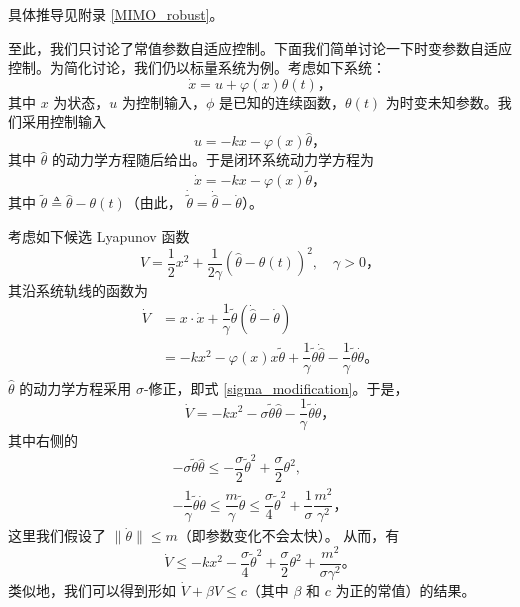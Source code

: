 具体推导见附录 \ref{MIMO_robust}。

至此，我们只讨论了常值参数自适应控制。下面我们简单讨论一下时变参数自适应控制。为简化讨论，我们仍以标量系统为例。考虑如下系统：
\begin{equation}
    \dot{x} = u + \varphi(x) \theta(t) \text{，}
\end{equation}
其中 $x$ 为状态，$u$ 为控制输入，$\phi$ 是已知的连续函数，$\theta(t)$ 为时变未知参数。我们采用控制输入
\[
    u = -k x - \varphi(x) \hat{\theta} \text{，}
\]
其中 $\hat{\theta}$ 的动力学方程随后给出。于是闭环系统动力学方程为
\[
    \dot{x} = -k x - \varphi(x) \tilde{\theta} \text{，}
\]
其中 $\tilde{\theta} \triangleq \hat{\theta} - \theta(t)$（由此， $\dot{\tilde{\theta}} = \dot{\hat{\theta}} - \dot{\theta}$）。

考虑如下候选 Lyapunov 函数
\[
    V = \dfrac{1}{2} x^2 + \dfrac{1}{2 \gamma} {\left( \hat{\theta} - \theta(t) \right)}^2, \quad \gamma > 0 \text{，}
\]
其沿系统轨线的函数为
\begin{align*}
    \dot{V} &= x \cdot \dot{x} + \dfrac{1}{\gamma} \tilde{\theta} \left( \dot{\hat{\theta}} - \dot{\theta} \right) \\
    &= -k x^2 - \varphi(x) x \tilde{\theta} + \dfrac{1}{\gamma} \tilde{\theta} \dot{\hat{\theta}} - \dfrac{1}{\gamma} \tilde{\theta} \dot{\theta} \text{。}
\end{align*}
$\hat{\theta}$ 的动力学方程采用 $\sigma$-修正，即式 \eqref{sigma_modification}。于是，
\[
    \dot{V} = -k x^2 - \sigma \tilde{\theta} \hat{\theta} - \dfrac{1}{\gamma} \tilde{\theta} \dot{\theta} \text{，}
\]
其中右侧的
\begin{gather*}
    -\sigma \tilde{\theta} \hat{\theta} \leq -\dfrac{\sigma}{2} {\tilde{\theta}}^2 + \dfrac{\sigma}{2} {\theta}^2, \\
    -\dfrac{1}{\gamma} \tilde{\theta} \dot{\theta} \leq \dfrac{m}{\gamma} \tilde{\theta} \leq \dfrac{\sigma}{4} \tilde{\theta}^2 + \dfrac{1}{\sigma} \dfrac{m^2}{\gamma^2} \text{，}
\end{gather*}
这里我们假设了 $\| \dot{\theta} \| \leq m$（即参数变化不会太快）。
从而，有
\[
    \dot{V} \leq -k x^2 - \dfrac{\sigma}{4} {\tilde{\theta}}^2 + \dfrac{\sigma}{2} \theta^2 + \dfrac{m^2}{\sigma \gamma^2} \text{。}
\]
类似地，我们可以得到形如 $\dot{V} + \beta{V} \leq c$（其中 $\beta$ 和 $c$ 为正的常值）的结果。

